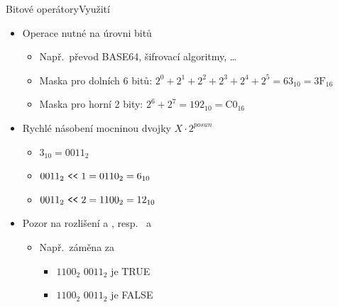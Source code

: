 \begin{frame}{Bitové operátory}{Využití}

  \begin{itemize}
    \item Operace nutné na úrovni bitů
    \begin{itemize}
      \item Např.\ převod BASE64, šifrovací algoritmy, \dots
      \item Maska pro dolních 6 bitů: $2^0+2^1+2^2+2^3+2^4+2^5 = 63_{10} =
	 \text{3F}_{16}$
      \item Maska pro horní 2 bity: $2^6+2^7 = 192_{10} = \text{C0}_{16}$
    \end{itemize}

    \pause

    \item Rychlé násobení mocninou dvojky $X \cdot 2^{posun}$
    \begin{itemize}
      \item $3_{10} = 0011_2$

      \pause

      \item $0011_2\ \text{\code{<<}}\ 1 = 0110_2 = 6_{10}$

      \pause

      \item $0011_2\ \text{\code{<<}}\ 2 = 1100_2 = 12_{10}$
    \end{itemize}

    \pause

    \item Pozor na rozlišení \code{\&} a \code{\&\&}, resp.\ \code{|} a
      \code{||}
    \begin{itemize}
      \item Např.\ záměna \code{\&} za \code{\&\&}
      \begin{itemize}
	\item $1100_2$ \code{\&\&} $0011_2$ je TRUE
	\item $1100_2$ \code{\&} $0011_2$ je FALSE
      \end{itemize}
    \end{itemize}

  \end{itemize}

\end{frame}

